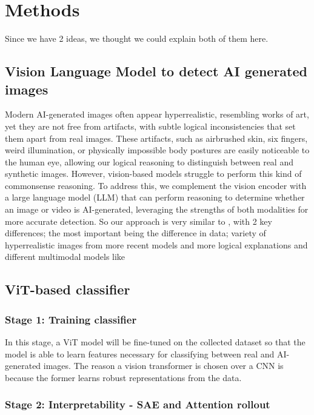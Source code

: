 \documentclass[10pt,twocolumn,letterpaper]{article}
\begin{document}
\section{Methods}
Since we have 2 ideas, we thought we could explain both of them here.

\subsection{Vision Language Model to detect AI generated images}
Modern AI-generated images often appear hyperrealistic, resembling works of art, yet they are not free from artifacts, with subtle logical inconsistencies that set them apart from real images. These artifacts, such as airbrushed skin, six fingers, weird illumination, or physically impossible body postures are easily noticeable to the human eye, allowing our logical reasoning to distinguish between real and synthetic images. However, vision-based models struggle to perform this kind of commonsense reasoning. To address this, we complement  the vision encoder with a large language model (LLM) that can perform reasoning to determine whether an image or video is AI-generated, leveraging the strengths of both modalities for more accurate detection. So our approach is very similar to \cite{zhangCommonSenseReasoning2025}, with 2 key differences; the most important being the difference in data; variety of hyperrealistic images from more recent models and more logical explanations and different multimodal models like \cite{steiner2024paligemma2familyversatile, abdin2024phi3technicalreporthighly, chen2024far, chen2024internvl}

\subsection{ViT-based classifier}
\subsubsection{Stage 1: Training classifier}
\label{subsubsec:vit-training}
In this stage, a ViT model \cite{dosovitskiyImageWorth16x162021} will be fine-tuned on the collected dataset so that the model is able to learn features necessary for classifying between real and AI-generated images. The reason a vision transformer is chosen over a CNN is because the former learns robust representations from the data.

\subsubsection{Stage 2: Interpretability - SAE and Attention rollout}
\end{document}
